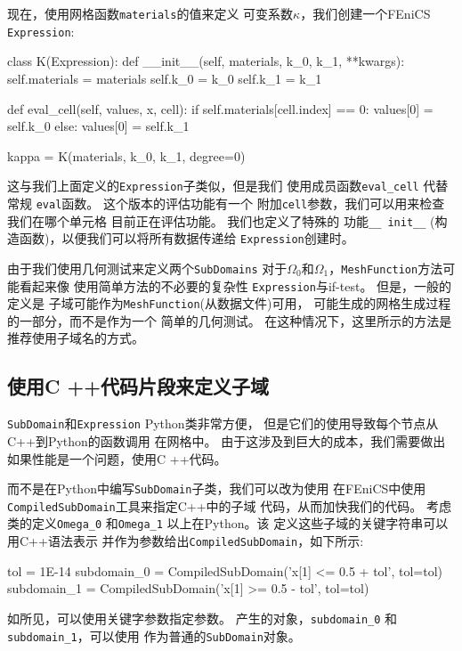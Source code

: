 现在，使用网格函数\texttt{materials}的值来定义
可变系数$\kappa$，我们创建一个FEniCS \texttt{Expression}:

\begin{python}
class K(Expression):
    def __init__(self, materials, k_0, k_1, **kwargs):
        self.materials = materials
        self.k_0 = k_0
        self.k_1 = k_1

def eval_cell(self, values, x, cell):
        if self.materials[cell.index] == 0:
            values[0] = self.k_0
        else:
            values[0] = self.k_1

kappa = K(materials, k_0, k_1, degree=0)
\end{python}

这与我们上面定义的\texttt{Expression}子类似，但是我们
使用成员函数\verb!eval_cell! 代替常规
\texttt{eval}函数。 这个版本的评估功能有一个
附加\texttt{cell}参数，我们可以用来检查我们在哪个单元格
目前正在评估功能。 我们也定义了特殊的
功能\verb!__ init__! (构造函数)，以便我们可以将所有数据传递给
\texttt{Expression}创建时。

由于我们使用几何测试来定义两个\texttt{SubDomains}
对于$\Omega_0$和$\Omega_1$，\texttt{MeshFunction}方法可能看起来像
使用简单方法的不必要的复杂性
\texttt{Expression}与if-test。 但是，一般的定义是
子域可能作为\texttt{MeshFunction}(从数据文件)可用，
可能生成的网格生成过程的一部分，而不是作为一个
简单的几何测试。 在这种情况下，这里所示的方法是
推荐使用子域名的方式。


\subsection{使用C ++代码片段来定义子域}

\texttt{SubDomain}和\texttt{Expression} Python类非常方便，
但是它们的使用导致每个节点从C++到Python的函数调用
在网格中。 由于这涉及到巨大的成本，我们需要做出
如果性能是一个问题，使用C ++代码。

而不是在Python中编写\texttt{SubDomain}子类，我们可以改为使用
在FEniCS中使用\texttt{CompiledSubDomain}工具来指定C++中的子域
代码，从而加快我们的代码。 考虑
类的定义\verb!Omega_0! 和\verb!Omega_1! 以上在Python。该
定义这些子域的关键字符串可以用C++语法表示
并作为参数给出\texttt{CompiledSubDomain}，如下所示:

\begin{python}
tol = 1E-14
subdomain_0 = CompiledSubDomain('x[1] <= 0.5 + tol', tol=tol)
subdomain_1 = CompiledSubDomain('x[1] >= 0.5 - tol', tol=tol)
\end{python}
如所见，可以使用关键字参数指定参数。
产生的对象，\verb!subdomain_0! 和\verb!subdomain_1!，可以使用
作为普通的\texttt{SubDomain}对象。

